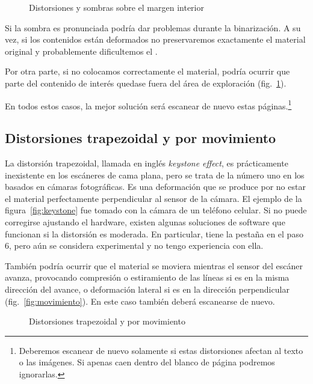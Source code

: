 \documentclass[%
	a5paper,
	10pt,
	twoside,
	openright,
	final,
]{memoir}
\begin{document}
	\begin{figure}
		\hfill
		\caption{Distorsiones y sombras sobre el margen interior\label{fig:distortion1}}
	\end{figure}

	Si la sombra es pronunciada podría dar problemas durante la binarización. A su vez, si los contenidos están deformados no preservaremos exactamente el material original y probablemente dificultemos el \ocr.

	Por otra parte, si no colocamos correctamente el material, podría ocurrir que parte del contenido de interés quedase fuera del área de exploración (fig.~\ref{fig:distortion1}).

	En todos estos casos, la mejor solución será escanear de nuevo estas páginas.\footnote{Deberemos escanear de nuevo solamente si estas distorsiones afectan al texto o las imágenes. Si apenas caen dentro del blanco de página podremos ignorarlas.}

	\subsection{Distorsiones trapezoidal y por movimiento} La distorsión trapezoidal, llamada en inglés \emph{keystone effect}, es prácticamente inexistente en los escáneres de cama plana, pero se trata de la número uno en los basados en cámaras fotográficas. Es una deformación que se produce por no estar el material perfectamente perpendicular al sensor de la cámara. El ejemplo de la figura~\ref{fig:keystone} fue tomado con la cámara de un teléfono celular. Si no puede corregirse ajustando el hardware, existen algunas soluciones de software que funcionan si la distorsión es moderada. En particular, \scantailor tiene la pestaña  en el paso 6, pero aún se considera experimental y no tengo experiencia con ella.

	También podría ocurrir que el material se moviera mientras el sensor del escáner avanza, provocando compresión o estiramiento de las líneas si es en la misma dirección del avance, o deformación lateral si es en la dirección perpendicular (fig.~\ref{fig:movimiento}). En este caso también deberá escanearse de nuevo.

	\begin{figure}
		\hfill
		\caption{Distorsiones trapezoidal y por movimiento\label{fig:distortion2}}
	\end{figure}
\end{document}

